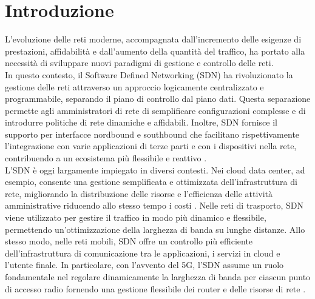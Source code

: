 \chapter{Introduzione}
L’evoluzione delle reti moderne, accompagnata dall’incremento delle esigenze di prestazioni, affidabilità e dall'aumento della quantità del traffico, ha portato alla necessità di sviluppare nuovi paradigmi di gestione e controllo delle reti. 
\\In questo contesto, il Software Defined Networking (SDN) ha rivoluzionato la gestione delle reti attraverso un approccio logicamente centralizzato e programmabile, separando il piano di controllo dal piano dati.
Questa separazione permette agli amministratori di rete di semplificare configurazioni complesse e di introdurre politiche di rete dinamiche e affidabili.
Inoltre, SDN fornisce il supporto per interfacce nordbound e southbound che facilitano rispettivamente l'integrazione con varie applicazioni di terze parti e con i dispositivi nella rete, contribuendo a un ecosistema più flessibile e reattivo \cite{sdnart}.
\\L’SDN è oggi largamente impiegato in diversi contesti. 
Nei cloud data center, ad esempio, consente una gestione semplificata e ottimizzata dell’infrastruttura di rete, migliorando la distribuzione delle risorse e l'efficienza  delle attività amministrative riducendo allo stesso tempo i costi \cite{datacent}. 
Nelle reti di trasporto, SDN viene utilizzato per gestire il traffico in modo più dinamico e flessibile, permettendo un'ottimizzazione della larghezza di banda su lunghe distanze. Allo stesso modo, 
nelle reti mobili, SDN offre un controllo più efficiente dell'infrastruttura di comunicazione
tra le applicazioni, i servizi in cloud e l'utente finale. 
In particolare, con l'avvento del 5G, l'SDN assume un ruolo fondamentale nel regolare dinamicamente la larghezza di banda per ciascun punto di accesso radio fornendo una gestione flessibile dei router e delle risorse di rete\cite{5g} \cite{5gart}.
